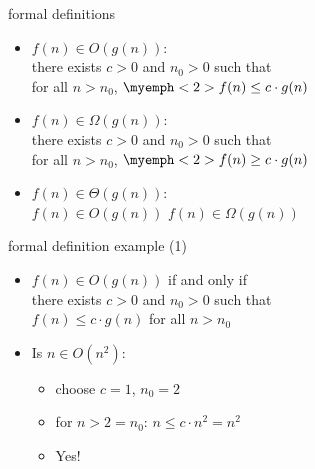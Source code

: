 \begin{frame}{formal definitions}
    \begin{itemize}
    \item $f(n) \in O(g(n))$: \\
        \hspace{.5cm}there exists $c > 0$ and $n_0 > 0$ such that \\
        \hspace{.5cm}for all $n > n_0$, $\myemph<2>{f(n) \le c \cdot g(n)}$
    \vspace{.5cm}
    \item<2-> $f(n) \in \Omega(g(n))$: \\
        \hspace{.5cm}there exists $c > 0$ and $n_0 > 0$ such that \\
        \hspace{.5cm}for all $n > n_0$, $\myemph<2>{f(n) \ge c \cdot g(n)}$
    \vspace{.5cm}
    \item<3-> $f(n) \in \Theta(g(n))$: \\
          \hspace{.5cm} $f(n) \in O(g(n))$  $f(n) \in \Omega(g(n))$
    \end{itemize}
\end{frame}

\begin{frame}{formal definition example (1)}
    \begin{itemize}
    \item $f(n) \in O(g(n))$ if and only if \\
        \hspace{.5cm}there exists $c > 0$ and $n_0 > 0$ such that \\
        \hspace{.5cm}$f(n) \le c \cdot g(n)$ for all $n > n_0$
    \item Is $ n \in O(n^2)$:
        \begin{itemize}
        \item<2-> choose $c = 1$, $n_0 = 2$
        \item<2-> for $n > 2=n_0$: $n \le c\cdot n^2 = n^2$
        \item<2-> Yes!
        \end{itemize}
    \end{itemize}
\end{frame}

